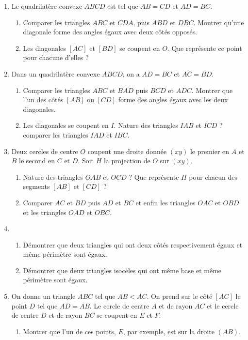 \documentclass[12 pt]{report}
\theoremstyle{plain}
\newcounter{n}
\begin{document}
\begin{enumerate}
\begin{enumerate}
\end{enumerate}
\item Le quadrilatère convexe $ABCD$ est tel que $AB=CD$ et $AD=BC$. \begin{enumerate}
\item Comparer les triangles $ABC$ et $CDA$, puis $ABD$ et $DBC$. Montrer qu'une diagonale forme des angles égaux avec deux côtés opposés. 
\item Les diagonales $[AC]$ et $[BD]$ se coupent en $O$. Que représente ce point pour
chacune d'elles ?
\end{enumerate}
\item Dans un quadrilatère convexe $ABCD$, on a $AD=BC$ et $AC=BD$. 
\begin{enumerate}
\item Comparer les triangles $ABC$ et $BAD$ puis $BCD$ et $ADC$. Montrer que l'un des côtés $[AB]$ ou $[CD]$ forme des angles égaux avec les deux diagonales.
\item Les diagonales se coupent en $I$. Nature des triangles $IAB$ et $ICD$ ? 
comparer les triangles $IAD$ et $IBC$. 
\end{enumerate}
\item Deux cercles de centre $O$ coupent une droite donnée $(xy)$ le premier en $A$ et $B$ le second en $C$ et $D$. Soit $H$ la projection de $O$ sur $(xy)$.
\begin{enumerate}
\item Nature des triangles $OAB$ et $OCD$ ? Que représente $H$ pour chacun des segments $[AB]$ et $[CD]$ ?
\item Comparer $AC$ et $BD$ puis $AD$ et $BC$ et enfin les triangles $OAC$ et $OBD$ et les triangles $OAD$ et $OBC$.
\end{enumerate}
\item \begin{enumerate}
\item Démontrer que deux triangles qui ont deux côtés respectivement égaux et même périmètre sont égaux.
\item Démontrer que deux triangles isocèles qui ont même base et même périmètre sont égaux.
\end{enumerate}
\item On donne un triangle $ABC$ tel que $AB<AC$. On prend sur le côté $[AC]$ le point $D$ tel que $AD=AB$. Le cercle de centre $A$ et de rayon $AC$ et le cercle de centre $D$ et de rayon $BC$ se coupent en $E$ et $F$. \begin{enumerate}
\item Montrer que l'un de ces points, $E$, par exemple, est sur la droite $(AB)$. 

\end{enumerate}
\end{enumerate}
\end{document}
